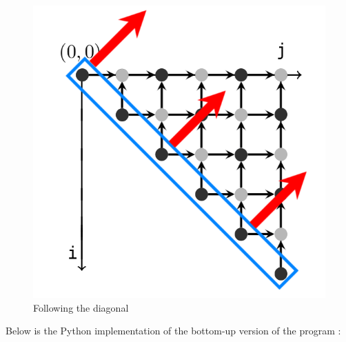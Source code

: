 \documentclass[a4paper,12pt,fleqn]{article}
\begin{document}
\begin{figure}[H]
    \centering
    \includegraphics[scale=0.5]{tabulation_02.png}

    \caption{Following the diagonal}
    \label{fig:tabulation_02}
\end{figure}

\noindent
Below is the Python implementation of the bottom-up version of the program :
\end{document}
